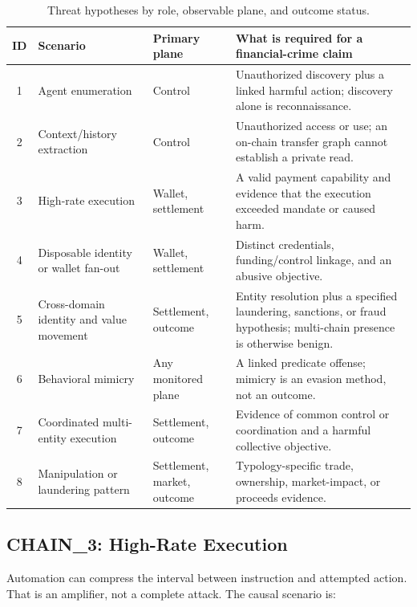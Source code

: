 \begin{table}[t]
  \centering
  \caption{Threat hypotheses by role, observable plane, and outcome status.}
  \label{tab:attack_chains}
  \small
  \begin{tabularx}{\textwidth}{@{}c p{2.9cm} p{3.1cm} X@{}}
    \toprule
    \textbf{ID} & \textbf{Scenario} & \textbf{Primary plane} &
      \textbf{What is required for a financial-crime claim} \\
    \midrule
    1 & Agent enumeration & Control & Unauthorized discovery plus a linked
      harmful action; discovery alone is reconnaissance. \\
    2 & Context/history extraction & Control & Unauthorized access or use;
      an on-chain transfer graph cannot establish a private read. \\
    3 & High-rate execution & Wallet, settlement & A valid payment capability
      and evidence that the execution exceeded mandate or caused harm. \\
    4 & Disposable identity or wallet fan-out & Wallet, settlement & Distinct
      credentials, funding/control linkage, and an abusive objective. \\
    5 & Cross-domain identity and value movement & Settlement, outcome & Entity
      resolution plus a specified laundering, sanctions, or fraud hypothesis;
      multi-chain presence is otherwise benign. \\
    6 & Behavioral mimicry & Any monitored plane & A linked predicate offense;
      mimicry is an evasion method, not an outcome. \\
    7 & Coordinated multi-entity execution & Settlement, outcome & Evidence of
      common control or coordination and a harmful collective objective. \\
    8 & Manipulation or laundering pattern & Settlement, market, outcome &
      Typology-specific trade, ownership, market-impact, or proceeds evidence. \\
    \bottomrule
  \end{tabularx}
\end{table}

\subsection{CHAIN\_3: High-Rate Execution}\label{subsec:chain3}

Automation can compress the interval between instruction and attempted action.
That is an amplifier, not a complete attack.  The causal scenario is:

